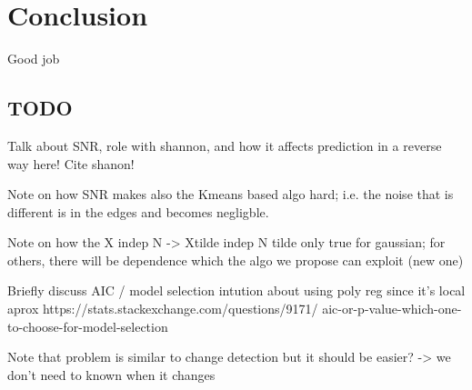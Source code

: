 \chapter{Conclusion}

Good job

\section{TODO}

Talk about SNR, role with shannon, and how it affects prediction in a reverse way here! Cite shanon!

Note on how SNR makes also the Kmeans based algo hard; i.e. the noise that is different is 
in the edges and becomes negligble.

Note on how the X indep N -> Xtilde indep N tilde only true for gaussian; for others, there 
will be dependence which the algo we propose can exploit (new one)


Briefly discuss AIC / model selection
intution about using poly reg since it's local
aprox
https://stats.stackexchange.com/questions/9171/
aic-or-p-value-which-one-to-choose-for-model-selection

Note that problem is similar to change detection
but it should be easier? -> we don't need to known
when it changes